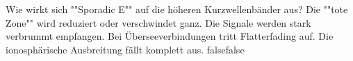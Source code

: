     {Wie wirkt sich ""Sporadic E"" auf die höheren Kurzwellenbänder aus?}
    {Die ""tote Zone"" wird reduziert oder verschwindet ganz.}
    {Die Signale werden stark verbrummt empfangen.}
    {Bei Überseeverbindungen tritt Flatterfading auf.}
    {Die ionosphärische Ausbreitung fällt komplett aus.}
    {false}{false}